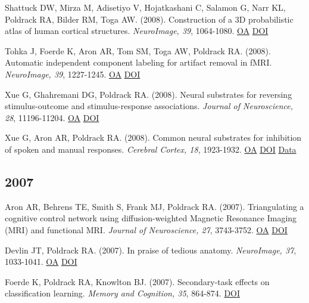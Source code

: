 \documentclass[10pt, letterpaper]{article}
\begin{document}
Shattuck DW, Mirza M, Adisetiyo V, Hojatkashani C, Salamon G, Narr KL, Poldrack RA, Bilder RM, Toga AW.  (2008). Construction of a 3D probabilistic atlas of human cortical structures. \textit{NeuroImage, 39}, 1064-1080. \href{https://www.ncbi.nlm.nih.gov/pmc/articles/PMC2757616}{OA} \href{https://doi.org/10.1016/j.neuroimage.2007.09.031}{DOI} \vspace{2mm}

Tohka J, Foerde K, Aron AR, Tom SM, Toga AW, Poldrack RA.  (2008). Automatic independent component labeling for artifact removal in fMRI. \textit{NeuroImage, 39}, 1227-1245. \href{https://www.ncbi.nlm.nih.gov/pmc/articles/PMC2374836}{OA} \href{https://doi.org/10.1016/j.neuroimage.2007.10.013}{DOI} \vspace{2mm}

Xue G, Ghahremani DG, Poldrack RA.  (2008). Neural substrates for reversing stimulus-outcome and stimulus-response associations. \textit{Journal of Neuroscience, 28}, 11196-11204. \href{https://www.ncbi.nlm.nih.gov/pmc/articles/PMC6671509}{OA} \href{https://doi.org/10.1523/jneurosci.4001-08.2008}{DOI} \vspace{2mm}

Xue G, Aron AR, Poldrack RA.  (2008). Common neural substrates for inhibition of spoken and manual responses. \textit{Cerebral Cortex, 18}, 1923-1932. \href{https://doi.org/10.1093/cercor/bhm220}{OA} \href{https://doi.org/10.1093/cercor/bhm220}{DOI} \href{https://openneuro.org/datasets/ds000007/versions/00001}{Data} \vspace{2mm}

\subsection*{2007}Aron AR, Behrens TE, Smith S, Frank MJ, Poldrack RA.  (2007). Triangulating a cognitive control network using diffusion-weighted Magnetic Resonance Imaging (MRI) and functional MRI. \textit{Journal of Neuroscience, 27}, 3743-3752. \href{https://www.ncbi.nlm.nih.gov/pmc/articles/PMC6672420}{OA} \href{https://doi.org/10.1523/jneurosci.0519-07.2007}{DOI} \vspace{2mm}

Devlin JT, Poldrack RA.  (2007). In praise of tedious anatomy. \textit{NeuroImage, 37}, 1033-1041. \href{https://www.ncbi.nlm.nih.gov/pmc/articles/PMC1986635}{OA} \href{https://doi.org/10.1016/j.neuroimage.2006.09.055}{DOI} \vspace{2mm}

Foerde K, Poldrack RA, Knowlton BJ.  (2007). Secondary-task effects on classification learning. \textit{Memory and Cognition, 35}, 864-874. \href{https://doi.org/10.3758/bf03193461}{DOI} \vspace{2mm}
\end{document}

